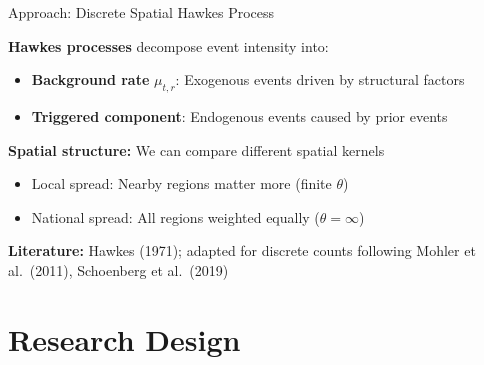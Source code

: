 \documentclass[aspectratio=169]{beamer}
\begin{document}
\begin{frame}{Approach: Discrete Spatial Hawkes Process}

\textbf{Hawkes processes} decompose event intensity into:

\begin{itemize}
    \item \textbf{Background rate} $\mu_{t,r}$: Exogenous events driven by structural factors
    \item \textbf{Triggered component}: Endogenous events caused by prior events
\end{itemize}

\vspace{1em}

\textbf{Spatial structure:} We can compare different spatial kernels

\vspace{0.5em}

\begin{itemize}
    \item Local spread: Nearby regions matter more (finite $\theta$)
    \item National spread: All regions weighted equally ($\theta = \infty$)
\end{itemize}

\vspace{1em}

\textbf{Literature:} Hawkes (1971); adapted for discrete counts following Mohler et al.\ (2011), Schoenberg et al.\ (2019)

\end{frame}


\section{Research Design}
\end{document}

